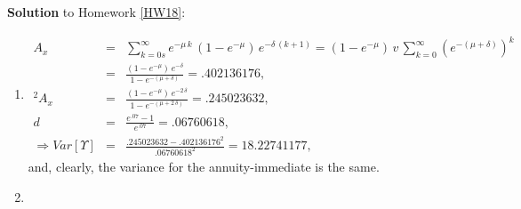 \documentclass[11pt,fleqn,oneside]{book}
\begin{document}
\noindent \textbf{Solution} to Homework \ref{HW18}:
\footnotesize
\begin{enumerate}
\item
\begin{eqnarray*}
A_x &=& \sum_{k=0s}^{\infty} e^{-\mu\,k}\,(1-e^{-\mu})\,e^{-\delta\,(k+1)} = (1-e^{-\mu}) \,v\, \sum_{k=0}^{\infty} \left(e^{-(\mu+\delta)}\right)^k\\
&=& \frac{(1-e^{-\mu}) \,e^{-\delta}}{1 - e^{-(\mu+\delta)} } = .402136176,\\
{^2A_x} &=& \frac{(1-e^{-\mu}) \,e^{-2\,\delta}}{1 - e^{-(\mu+2\,\delta)} } = .245023632,\\
d &=& \frac{e^{.07} -1}{e^{.07}} = .06760618,\\
\Rightarrow Var[\Upsilon] &=& \frac{.245023632 - .402136176^2}{.06760618^2} = 18.22741177,
\end{eqnarray*}
and, clearly, the variance for the annuity-immediate is the same.
\item


\end{enumerate}
\end{document}
